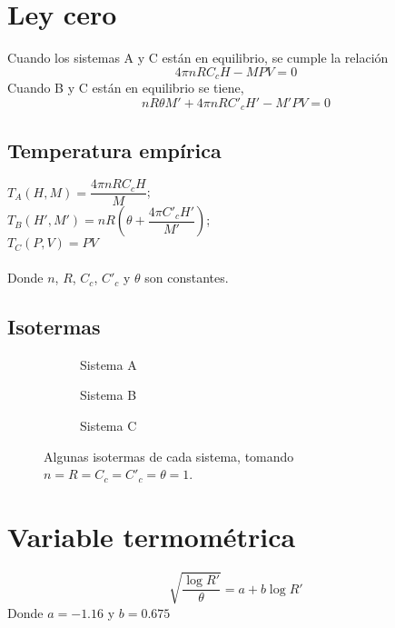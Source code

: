\documentclass[12pt]{article}
\begin{document}
\maketitle

\section{Ley cero}
Cuando los sistemas A y C están en equilibrio, se cumple la relación
\begin{equation}
4\pi nRC_{c}H-MPV=0  
\end{equation}
Cuando B y C están en equilibrio se tiene,
\begin{equation}
nR\theta M'+4\pi nRC'_cH'-M'PV=0
\end{equation}
\subsection{Temperatura empírica}
\begin{center}
  $T_A(H,M)=\dfrac{4\pi nRC_cH}{M}$; \\ 
  $T_B(H',M')=nR(\theta+\dfrac{4\pi C'_cH'}{M'})$;  \\
  $T_C(P,V)=PV$
\end{center}
\paragraph{}
Donde $n$, $R$, $C_c$, $C'_c $ y $\theta$ son constantes.
\subsection{Isotermas}

\begin{figure}[H]
  \centering
  \begin{subfigure}[b]{0.3\textwidth}
    \scalebox{.4}{}
    \caption{Sistema A}
  \end{subfigure}
  \begin{subfigure}[b]{0.3\textwidth}
    \scalebox{.4}{}
    \caption{Sistema B}
  \end{subfigure}
  \begin{subfigure}[b]{0.3\textwidth}
    \scalebox{.4}{}
    \caption{Sistema C}
  \end{subfigure}
  \caption{Algunas isotermas de cada sistema, tomando $n=R=C_c=C'_c=\theta =1$.}
\end{figure}
      
\section{Variable termométrica}
\begin{equation} \label{res}
\sqrt{\dfrac{\log{R'}}{\theta}}=a+b \log{R'}  
\end{equation}
Donde $a=-1.16$ y $b=0.675$
\end{document}
